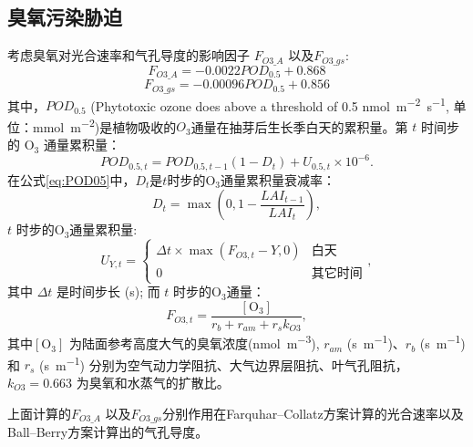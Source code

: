 \subsection{臭氧污染胁迫}
考虑臭氧对光合速率和气孔导度的影响因子 $F_{O3\_A}$ 以及$F_{O3\_{gs}}$:
\begin{equation}
F_{O3\_{A}}=-0.0022 POD_{0.5}+0.868
\end{equation}
\begin{equation}
F_{O3\_{gs}}=-0.00096 POD_{0.5}+0.856
\end{equation}
其中，$POD_{0.5}$ (Phytotoxic ozone does above a threshold of 0.5 \unit{nmol.m^{-2}.s^{-1}}, 单位：\unit{mmol.m^{-2}})是植物吸收的$O_3$通量在抽芽后生长季白天的累积量。第 $t$ 时间步的 $\mathrm{O_3}$ 通量累积量：
\begin{equation}\label{eq:POD05}
POD_{0.5,t}=POD_{0.5,t-1}\left(1-D_t\right)+U_{0.5,t} \times 10^{-6}.
\end{equation}
在公式\eqref{eq:POD05}中，$D_t$是$t$时步的$\mathrm{O_3}$通量累积量衰减率：
\begin{equation}
D_t = \max\left(0, 1-\frac{LAI_{t-1}}{LAI_t} \right),
\end{equation}
$t$ 时步的$\mathrm{O_3}$通量累积量:
\begin{equation}
U_{Y,t}=\begin{cases}
    \Delta t\times\max(F_{O3,t}-Y, 0) & \text{白天} \\
    0 & \text{其它时间}
\end{cases},
\end{equation}
其中 $\Delta t$ 是时间步长 (s); 而 $t$ 时步的$\mathrm{O_3}$通量：
\begin{equation}
    F_{O3,t}=\frac{\mathrm{[O_3]}}{r_b + r_{am} + r_sk_{O3}},
\end{equation}
其中$\mathrm{[O_3]}$ 为陆面参考高度大气的臭氧浓度(\unit{nmol.m^{-3}}), $r_{am}$ (\unit{s.m^{-1}})、$r_b$ (\unit{s.m^{-1}}) 和 $r_s$ (\unit{s.m^{-1}}) 分别为空气动力学阻抗、大气边界层阻抗、叶气孔阻抗，$k_{O3}=0.663$ 为臭氧和水蒸气的扩散比。

上面计算的$F_{{O3}\_A}$ 以及$F_{O3\_{gs}}$分别作用在Farquhar--Collatz方案计算的光合速率以及Ball--Berry方案计算出的气孔导度。

